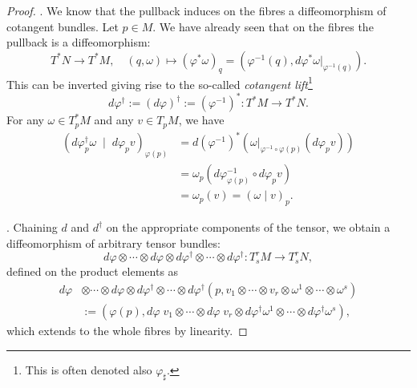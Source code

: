 \begin{proof}
	.
	We know that the pullback induces on the fibres a diffeomorphism of cotangent bundles. Let $p\in M$.
	We have already seen that on the fibres the pullback is a diffeomorphism:
	\begin{equation}
		T^*N \to T^* M, \quad
		(q,\omega) \mapsto (\varphi^*\omega)_q = \left(\varphi^{-1}(q), d\varphi^*\omega|_{\varphi^{-1}(q)}\right).
	\end{equation}
	This can be inverted giving rise to the so-called \emph{cotangent lift}\footnote{This is often denoted also $\varphi_\sharp$.}
	\begin{equation}
		d\varphi^\dagger :=(d\varphi)^\dagger := (\varphi^{-1})^*: T^*M \to T^*N.
	\end{equation}
	For any $\omega\in T_p^* M$ and any $v\in T_pM$, we have
	\begin{align}
		(d\varphi^\dagger_p \omega \;\mid\; d\varphi_p v)_{\varphi(p)} & =  d(\varphi^{-1})^*(\omega|_{\varphi^{-1}\circ\varphi(p)} (d\varphi_p v) ) \\
		                                                               & = \omega_p(d\varphi^{-1}_{\varphi(p)} \circ d\varphi_p v )                  \\
		                                                               & = \omega_p(v) = (\omega \mid v)_p.
	\end{align}

	.
	Chaining $d$ and $d^\dagger$ on the appropriate components of the tensor, we obtain a diffeomorphism of arbitrary tensor bundles:
	\begin{equation}
		d\varphi \otimes\cdots\otimes d\varphi \otimes d\varphi^\dagger \otimes\cdots\otimes d\varphi^\dagger  : T_s^rM \to T_s^r N,
	\end{equation}
	defined on the product elements as
	\begin{align}
		d\varphi & \otimes\cdots\otimes d\varphi \otimes d\varphi^\dagger \otimes\cdots\otimes d\varphi^\dagger  (p, v_1 \otimes \cdots\otimes v_r \otimes \omega^1\otimes\cdots\otimes\omega^s) \\
		         & := (\varphi(p), d\varphi\; v_1 \otimes \cdots\otimes d\varphi\; v_r \otimes d\varphi^\dagger \omega^1\otimes\cdots\otimes d\varphi^\dagger \omega^s),
	\end{align}
	which extends to the whole fibres by linearity.
\end{proof}

